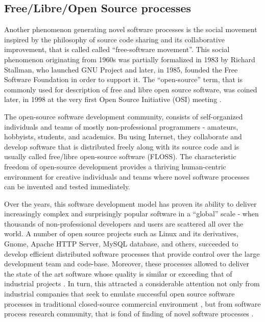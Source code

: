 %
%
\subsection{Free/Libre/Open Source processes}\label{sec_floss_processes}
Another phenomenon generating novel software processes is the social movement inspired by the philosophy 
of source code sharing and its collaborative improvement, that is called called ``free-software movement''. 
This social phenomenon originating from 1960s was partially formalized in 1983 by Richard Stallman,
who launched GNU Project and later, in 1985, founded the Free Software Foundation in order to support 
it. The ``open-source'' term, that is commonly used for description of free and libre open source software, 
was coined later, in 1998 at the very first Open Source Initiative (OSI) meeting \cite{osi-history}.

The open-source software development community, consists of self-organized individuals and teams of 
mostly non-professional programmers - amateurs, hobbyists, students, and academics. 
Bu using Internet, they collaborate and develop software that is distributed freely along with its 
source code and is usually called free/libre open-source software (FLOSS). 
The characteristic freedom of open-source development provides a thriving human-centric environment 
for creative individuals and teams where novel software processes can be invented and tested immediately.

Over the years, this software development model has proven its ability to deliver increasingly complex 
and surprisingly popular software in a ``global'' scale - when thousands of non-professional developers 
and users are scattered all over the world. A number of open source projects such as Linux and its 
derivatives, Gnome, Apache HTTP Server, MySQL database, and others, succeeded to develop efficient 
distributed software processes that provide control over the large development team and code-base.
Moreover, these processes allowed to deliver the state of the art software whose quality is similar 
or exceeding that of industrial projects \cite{coverity2012}. 
In turn, this attracted a considerable attention not only from industrial companies that seek to emulate 
successful open source software processes in traditional closed-source commercial environment 
\cite{oss_virtual_organizations} \cite{oss_balance} \cite{oss_hp} \cite{oss_4industry}, 
but from software process research community, that is fond of finding of novel software processes
\cite{citeulike:12550640} \cite{citeulike:5043664} \cite{citeulike:5128808} \cite{citeulike:10377366}.

